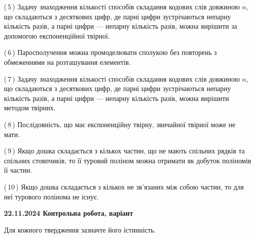\documentclass[12pt, ukrainian]{article}
\begin{document}
\begin {large}
\begin {large}
\begin {large}
\begin {large}
\begin {large}
\begin {large}
\begin {large}
\begin {large}
\begin {large}
\begin {large}
\begin {large}
\begin {large}
\begin {large}
\begin {large}
\begin {large}
\begin {large}
\begin {large}
\begin {large}
\begin {large}
\begin {large}
\begin {large}
\begin {large}
\begin {large}
\begin {large}
\begin {large}
\begin {large}
\begin {large}
\begin {large}
\begin {large}
\begin {large}
\begin {large}
\begin {large}
\begin {large}
\begin {large}
\begin {large}
\begin {large}
\begin {large}
\begin {large}
\begin {large}
\begin {large}
\begin {large}
\begin {large}
\begin {large}
\begin {large}
{(\,5\,) Задачу знаходження кількості способів складання кодових слів довжиною $n$, що складаються з десяткових цифр, де парні цифри зустрічаються непарну кількість разів, а парні цифри — непарну кількість разів, можна вирішити за допомогою експоненційної твірної.%



(\,6\,) Паросполучення можна промоделювати сполукою без повторень з обмеженнями на розташування елементів.%



(\,7\,) Задачу знаходження кількості способів складання кодових слів довжиною $n$, що складаються з десяткових цифр, де парні цифри зустрічаються непарну кількість разів, а парні цифри — непарну кількість разів, можна вирішити методом твірних.%



(\,8\,) Послідовність, що має експоненційну твірну, звичайної твірної може не мати.%



(\,9\,) Якщо дошка складається з кількох частин, що не мають спільних рядків та спільних стовпчиків, то її туровий поліном можна отримати як добуток поліномів її частин.%



(\,10\,) Якщо дошка складається з кількох не зв’язаних між собою частин, то для неї турового полінома не існує.%




\vspace{5mm}
}
\newpage

\begin {large}

\textbf{22.11.2024 Контрольна робота, варіант  }\par


{
Для кожного твердження зазначте його істинність.\par

\vspace{2mm}

}
\end{large}
\end{large}
\end{large}
\end{large}
\end{large}
\end{large}
\end{large}
\end{large}
\end{large}
\end{large}
\end{large}
\end{large}
\end{large}
\end{large}
\end{large}
\end{large}
\end{large}
\end{large}
\end{large}
\end{large}
\end{large}
\end{large}
\end{large}
\end{large}
\end{large}
\end{large}
\end{large}
\end{large}
\end{large}
\end{large}
\end{large}
\end{large}
\end{large}
\end{large}
\end{large}
\end{large}
\end{large}
\end{large}
\end{large}
\end{large}
\end{large}
\end{large}
\end{large}
\end{large}
\end{large}
\end{document}
